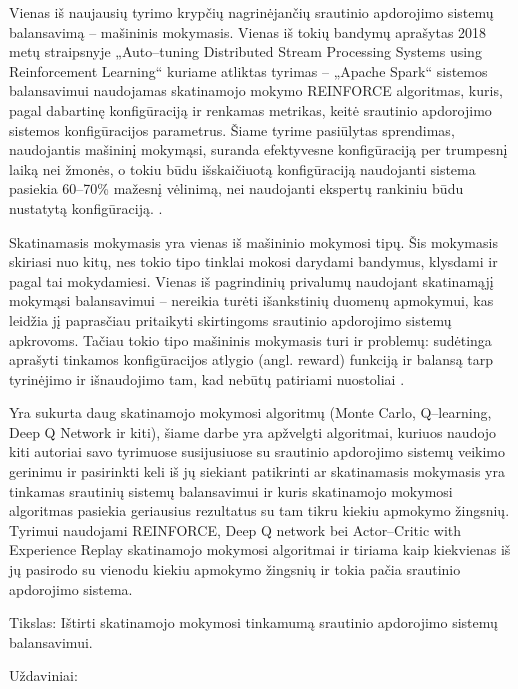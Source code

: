\documentclass{VUMIFPSbakalaurinis}
\begin{document}
Vienas iš naujausių tyrimo krypčių nagrinėjančių srautinio apdorojimo sistemų balansavimą – mašininis mokymasis. Vienas iš tokių bandymų aprašytas 2018 metų straipsnyje „Auto–tuning Distributed Stream Processing Systems using Reinforcement Learning“\cite{vaquero2018autotuning} kuriame atliktas tyrimas – „Apache Spark“ sistemos balansavimui naudojamas skatinamojo mokymo REINFORCE algoritmas, kuris, pagal dabartinę konfigūraciją ir renkamas metrikas, keitė srautinio apdorojimo sistemos konfigūracijos parametrus. Šiame tyrime pasiūlytas sprendimas, naudojantis mašininį mokymąsi, suranda efektyvesne konfigūraciją per trumpesnį laiką nei žmonės, o tokiu būdu išskaičiuotą konfigūraciją naudojanti sistema pasiekia 60–70\% mažesnį vėlinimą, nei naudojanti ekspertų rankiniu būdu nustatytą konfigūraciją. \cite{vaquero2018autotuning}. 

Skatinamasis mokymasis yra vienas iš mašininio mokymosi tipų. Šis mokymasis skiriasi nuo kitų, nes tokio tipo tinklai mokosi darydami bandymus, klysdami ir pagal tai mokydamiesi. Vienas iš pagrindinių privalumų naudojant skatinamąjį mokymąsi balansavimui – nereikia turėti išankstinių duomenų apmokymui, kas leidžia jį paprasčiau pritaikyti skirtingoms srautinio apdorojimo sistemų apkrovoms. Tačiau tokio tipo mašininis mokymasis turi ir problemų: sudėtinga aprašyti tinkamos konfigūracijos atlygio (angl. reward) funkciją ir balansą tarp tyrinėjimo ir išnaudojimo tam, kad nebūtų patiriami nuostoliai \cite{selfRegulatingStreaming}.

Yra sukurta daug skatinamojo mokymosi algoritmų (Monte Carlo, Q–learning, Deep Q Network ir kiti), šiame darbe yra apžvelgti algoritmai, kuriuos naudojo kiti autoriai savo tyrimuose susijusiuose su srautinio apdorojimo sistemų veikimo gerinimu ir pasirinkti keli iš jų siekiant patikrinti ar skatinamasis mokymasis yra tinkamas srautinių sistemų balansavimui ir kuris skatinamojo mokymosi algoritmas pasiekia geriausius rezultatus su tam tikru kiekiu apmokymo žingsnių. Tyrimui naudojami REINFORCE, Deep Q network bei Actor–Critic with Experience Replay skatinamojo mokymosi algoritmai ir tiriama kaip kiekvienas iš jų pasirodo su vienodu kiekiu apmokymo žingsnių ir tokia pačia srautinio apdorojimo sistema.

Tikslas: Ištirti skatinamojo mokymosi tinkamumą srautinio apdorojimo sistemų balansavimui. 

Uždaviniai:
\end{document}
